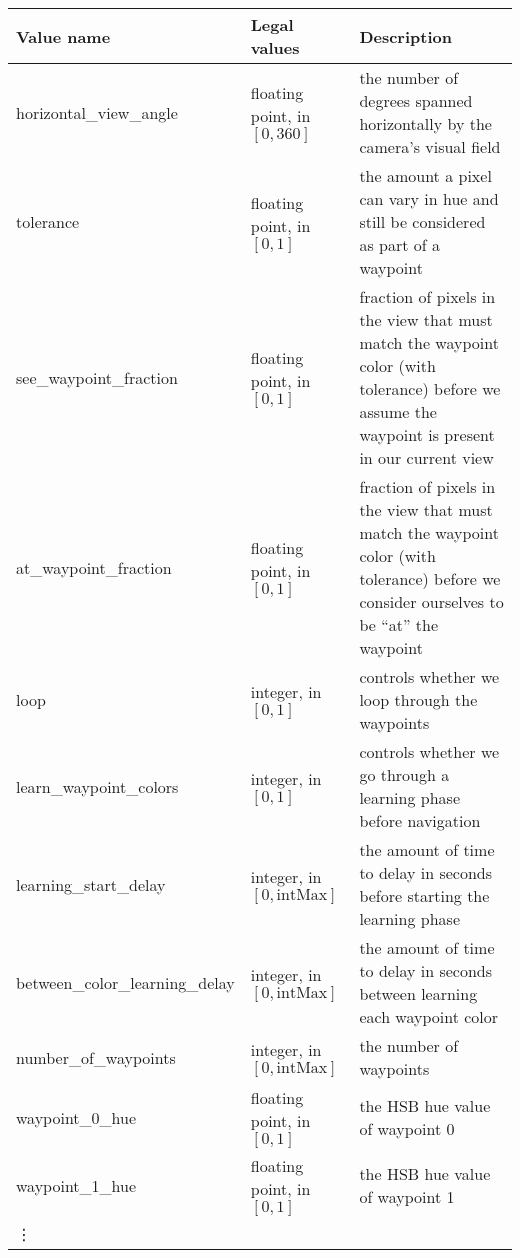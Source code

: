 \documentclass[12pt]{article}
\begin{document}
\begin{tabular}{|l|p{1.7in}|p{2in}|}
\hline
{\bf Value name } & {\bf Legal values} & {\bf Description} \\
\hline
horizontal\_view\_angle & floating point, in $[0, 360]$ & the number of degrees spanned horizontally by the camera's visual field\\
\hline

tolerance & floating point, in $[0, 1]$ & the amount a pixel can vary in hue and still be considered as part of a waypoint\\
\hline

see\_waypoint\_fraction & floating point, in $[0, 1]$ & fraction of pixels in the view that must match the waypoint color (with tolerance) before we assume the waypoint is present in our current view\\
\hline

at\_waypoint\_fraction & floating point, in $[0, 1]$ & fraction of pixels in the view that must match the waypoint color (with tolerance) before we consider ourselves to be ``at'' the waypoint\\
\hline

loop & integer, in $[0, 1]$ & controls whether we loop through the waypoints\\
\hline

learn\_waypoint\_colors & integer, in $[0, 1]$ & controls whether we go through a learning phase before navigation\\
\hline

learning\_start\_delay & integer, in $[0, \mbox{intMax}]$ & the amount of time to delay in seconds before starting the learning phase\\
\hline

between\_color\_learning\_delay & integer, in $[0, \mbox{intMax}]$ & the amount of time to delay in seconds between learning each waypoint color\\
\hline

number\_of\_waypoints & integer, in $[0, \mbox{intMax}]$ & the number of waypoints\\
\hline

waypoint\_0\_hue& floating point, in $[0, 1]$ & the HSB hue value of waypoint 0\\
\hline

waypoint\_1\_hue& floating point, in $[0, 1]$ & the HSB hue value of waypoint 1\\
\hline

\vdots & & \\
\hline

\end{tabular}
\end{document}
